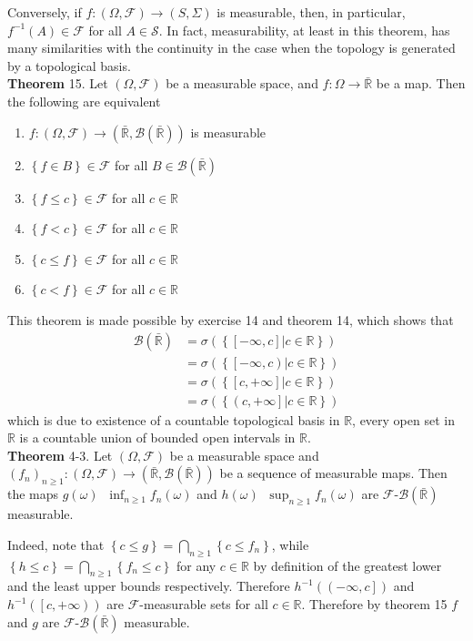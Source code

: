\documentclass[a4paper]{article}
\newcommand{\obj}[1]{\left\{ #1 \right \}}
\newcommand{\clo}[1]{\left [ #1 \right ]}
\newcommand{\clop}[1]{\left [ #1 \right )}
\newcommand{\ploc}[1]{\left ( #1 \right ]}
\newcommand{\brac}[1]{\left ( #1 \right )}
\newcommand{\induc}[1]{\left . #1 \right \vert}
\newcommand{\Rbar}{{\bar{\mathbb{R}}}}
\newcommand{\Real}{\mathbb{R}}
\newcommand{\Scal}{\mathcal{S}}
\newcommand{\Fcal}{\mathcal{F}}
\newcommand{\borel}[1]{\mathcal{B}\brac{#1}}
\newcommand{\defn}{\mathop{\overset{\Delta}{=}}\nolimits}
\begin{document}
Conversely, if $f:\brac{\Omega,\Fcal}\to\brac{S,\Sigma}$ is measurable, then, in particular, $f^{-1}\brac{A}\in\Fcal$ for all $A\in\Scal$. In fact, measurability, at least in this theorem, has many similarities with the continuity in the case when the topology is generated by a topological basis.\\

\label{thm:measurability2} \noindent \textbf{Theorem} 15.
Let $\brac{\Omega, \Fcal}$ be a measurable space, and $f:\Omega\to\Rbar$ be a map. Then the following are equivalent\begin{enumerate}
	\item $f:\brac{\Omega,\Fcal}\to\brac{\Rbar,\borel{\Rbar}}$ is measurable
	\item $\obj{f\in B}\in \Fcal$ for all $B\in \borel{\Rbar}$
	\item $\obj{f\leq c}\in \Fcal$ for all $c\in \Real$
	\item $\obj{f < c}\in \Fcal$ for all $c\in \Real$
	\item $\obj{c\leq f}\in \Fcal$ for all $c\in \Real$
	\item $\obj{c < f}\in \Fcal$ for all $c\in \Real$
\end{enumerate}

This theorem is made possible by exercise 14 and theorem 14, which shows that\begin{align*}\borel{\Rbar} &= \sigma\brac{\obj{ \induc{ \clo{-\infty, c} } c\in \Real}} \\&= \sigma\brac{\obj{ \induc{ \left [-\infty, c \right) } c\in \Real}} \\&= \sigma\brac{\obj{ \induc{ \clo{c, +\infty} } c\in \Real}} \\&= \sigma\brac{\obj{ \induc{ \ploc{c, +\infty} } c\in \Real}}\end{align*} which is due to existence of a countable topological basis in $\Real$, every open set in $\Real$ is a countable union of bounded open intervals in $\Real$.\\

\label{thm:meas_inf} \noindent \textbf{Theorem} 4-3.
Let $\brac{\Omega, \Fcal}$ be a measurable space and $\brac{f_n}_{n\geq1}:\brac{\Omega, \Fcal}\to\brac{\Rbar,\borel{\Rbar}}$ be a sequence of measurable maps. Then the maps $g\brac{\omega}\defn \inf_{n\geq1}f_n\brac{\omega}$ and $h\brac{\omega}\defn \sup_{n\geq1}f_n\brac{\omega}$ are $\Fcal$-$\borel{\Rbar}$ measurable.

Indeed, note that $\obj{c\leq g}=\bigcap_{n\geq1}\obj{c\leq f_n}$, while $\obj{h\leq c}=\bigcap_{n\geq1}\obj{f_n\leq c}$ for any $c\in \Real$ by definition of the greatest lower and the least upper bounds respectively. Therefore $h^{-1}\brac{\ploc{-\infty,c}}$ and $h^{-1}\brac{\clop{c,+\infty}}$ are $\Fcal$-measurable sets for all $c\in \Real$. Therefore by theorem 15 $f$ and $g$ are $\Fcal$-$\borel{\Rbar}$ measurable.\\
\end{document}
